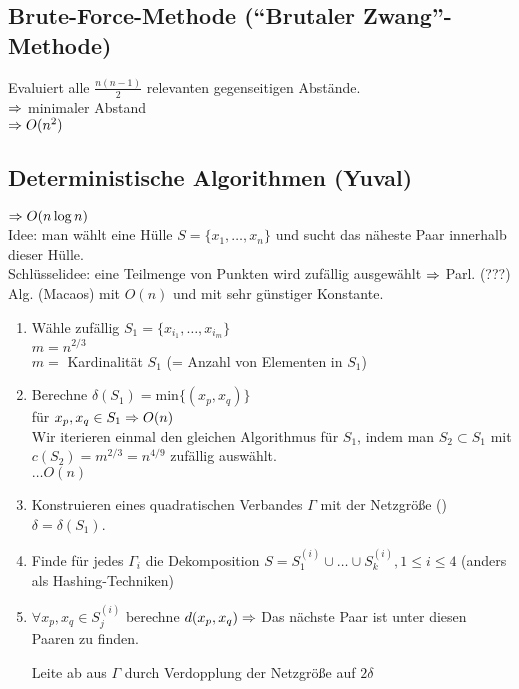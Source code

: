 \documentclass[a4paper]{scrartcl}
\begin{document}
\subsection{Brute-Force-Methode ("`Brutaler Zwang"'-Methode)}
Evaluiert alle $\frac{n(n-1)}{2}$ relevanten gegenseitigen Abstände.\\
$\Rightarrow$ minimaler Abstand\\
$\Rightarrow O(n^2)$\\

\subsection{Deterministische Algorithmen (Yuval)}
$\Rightarrow O(n \log n)$\\

Idee: man wählt eine Hülle $S=\{x_1, \ldots, x_n\}$ und sucht das näheste Paar innerhalb dieser Hülle.\\

Schlüsselidee: eine Teilmenge von Punkten wird zufällig ausgewählt
$\Rightarrow$ Parl. (???) Alg. (Macaos) mit $O(n)$ und mit sehr günstiger Konstante.

\begin{enumerate}
	\item Wähle zufällig $S_1 = \{x_{i_1}, \ldots, x_{i_m}\}$\\
				$m = n^{2/3}$\\ $m =$ Kardinalität $S_1$ (= Anzahl von Elementen in $S_1$)
	\item Berechne $\delta(S_1) = \text{min} \{(x_p, x_q)\}$\\
				für $x_p, x_q \in S_1 \Rightarrow O(n)$\\
				Wir iterieren einmal den gleichen Algorithmus für $S_1$, indem man $S_2 \subset S_1$ mit 
				$c(S_2)=m^{2/3}=n^{4/9}$ zufällig auswählt.\\ $\ldots O(n)$
	\item Konstruieren eines quadratischen Verbandes $\Gamma$ mit der Netzgröße () $\delta=\delta(S_1)$.
	

	\item Finde für jedes $\Gamma_i$ die Dekomposition $S = S^{(i)}_1 \cup \ldots \cup S^{(i)}_k, 1 \leq i \leq 4$
				(anders als Hashing-Techniken)
	\item $\forall x_p, x_q \in S^{(i)}_j$ berechne $d(x_p, x_q) \Rightarrow$ Das nächste Paar ist unter 
				diesen Paaren zu finden.

				Leite ab aus $\Gamma$ durch Verdopplung der Netzgröße auf $2\delta$
\end{enumerate}
\end{document}
